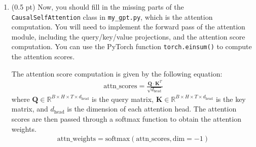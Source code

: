 \begin{enumerate}
\begin{answerbox}[2.8in]
    \end{answerbox}

    \item (0.5 pt) Now, you should fill in the missing parts of the
    \texttt{CausalSelfAttention} class in \texttt{my\_gpt.py}, which is the
    attention computation. You will need to implement the forward pass of the
    attention module, including the query/key/value projections, and the
    attention score computation. You can use the PyTorch function
    \texttt{torch.einsum()} to compute the attention scores.

 \begin{answerbox}[2in]
    The attention score computation is given by the following equation:
    \begin{align*}
        \text{attn\_scores} = \frac{\mathbf{Q} \cdot \mathbf{K}^T}{\sqrt{d_{\text{head}}}}
    \end{align*}
    where $\mathbf{Q} \in \mathbb{R}^{B \times H \times T \times d_{\text{head}}}$ is the query matrix, $\mathbf{K} \in \mathbb{R}^{B \times H \times T \times d_{\text{head}}}$ is the key matrix, and $d_{\text{head}}$ is the dimension of each attention head. The attention scores are then passed through a softmax function to obtain the attention weights.
    \begin{align*}
        \text{attn\_weights} = \text{softmax}(\text{attn\_scores}, \text{dim}=-1)
    \end{align*}

    \end{answerbox}



\end{enumerate}
